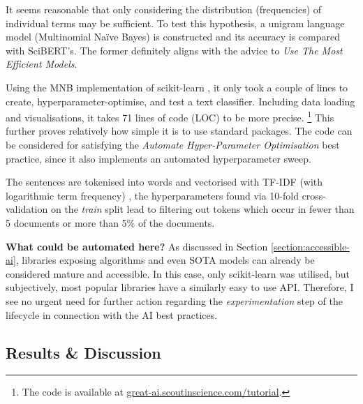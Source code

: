 It seems reasonable that only considering the distribution (frequencies) of individual terms may be sufficient. To test this hypothesis, a unigram language model (Multinomial Naïve Bayes) is constructed and its accuracy is compared with SciBERT's. The former definitely aligns with the advice to \textit{Use The Most Efficient Models}.

Using the MNB implementation of scikit-learn \cite{pedregosa2011scikit}, it only took a couple of lines to create, hyperparameter-optimise, and test a text classifier. Including data loading and visualisations, it takes 71 lines of code (LOC) to be more precise. \footnote{The code is available at \href{https://great-ai.scoutinscience.com/tutorial/}{great-ai.scoutinscience.com/tutorial}.} This further proves relatively how simple it is to use standard packages. The code can be considered for satisfying the \textit{Automate Hyper-Parameter Optimisation} best practice, since it also implements an automated hyperparameter sweep. 

The sentences are tokenised into words and vectorised with TF-IDF (with logarithmic term frequency) \cite{buckley1985implementation}, the hyperparameters found via 10-fold cross-validation on the \textit{train} split lead to filtering out tokens which occur in fewer than 5 documents or more than 5\% of the documents.

\begin{displayquote}
\textbf{What could be automated here?} As discussed in Section \ref{section:accessible-ai}, libraries exposing algorithms and even SOTA models can already be considered mature and accessible. In this case, only scikit-learn was utilised, but subjectively, most popular libraries have a similarly easy to use API. Therefore, I see no urgent need for further action regarding the \textit{experimentation} step of the lifecycle in connection with the AI best practices.
\end{displayquote}

\subsection{Results \& Discussion}

